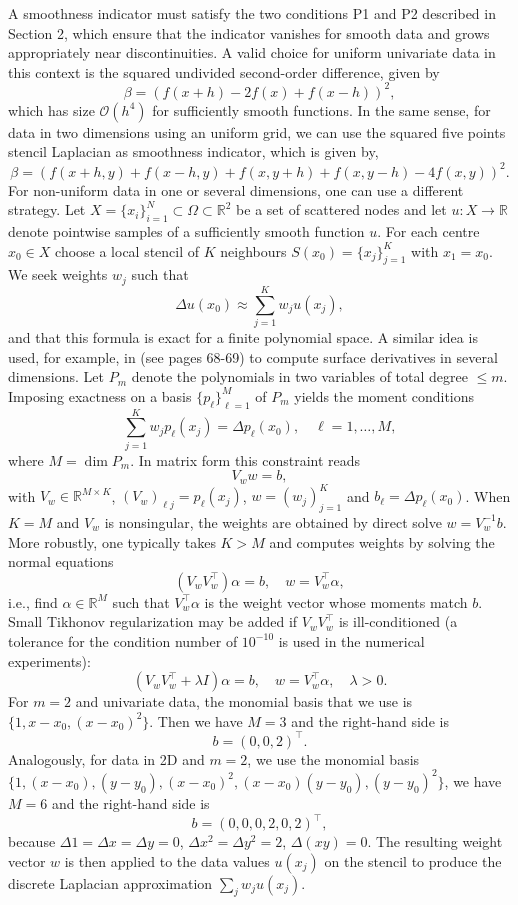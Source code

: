 \documentclass[preprint]{elsarticle}       %
\begin{document}
A smoothness indicator must satisfy the two conditions P1 and P2 described in Section 2, which ensure that the indicator vanishes for smooth data and grows appropriately near discontinuities. A valid choice for uniform univariate data in this context is the squared undivided second-order difference, given by
\begin{equation}\label{ud1}
\beta = \left( f(x+h) - 2f(x) + f(x-h) \right)^2,
\end{equation}
which has size $\mathcal{O}(h^4)$ for sufficiently smooth functions. In the same sense, for data in two dimensions using an uniform grid, we can use the squared five points stencil Laplacian as smoothness indicator, which is given by,
\begin{equation}\label{ud2}
\beta = \left( f(x+h, y) + f(x-h, y) + f(x, y+h) + f(x, y-h) - 4f(x, y) \right)^2.
\end{equation}
For non-uniform data in one or several dimensions, one can use a different strategy. 
Let $X = \{x_i\}_{i=1}^N \subset \Omega \subset \mathbb{R}^2$ be a set of scattered nodes and let $u : X \to \mathbb{R}$ denote pointwise samples of a sufficiently smooth function $u$. For each centre $x_0 \in X$ choose a local stencil of $K$ neighbours $S(x_0) = \{x_j\}_{j=1}^K$ with $x_1 = x_0$. We seek weights $w_j$ such that
\[
\Delta u(x_0) \approx \sum_{j=1}^K w_j u(x_j),
\]
and that this formula is exact for a finite polynomial space. A similar idea is used, for example, in \cite{LiIto2006} (see pages 68-69) to compute surface derivatives in several dimensions. Let $P_m$ denote the polynomials in two variables of total degree $\leq m$. Imposing exactness on a basis $\{p_\ell\}_{\ell=1}^M$ of $P_m$ yields the moment conditions
\[
\sum_{j=1}^K w_j p_\ell(x_j) = \Delta p_\ell(x_0), \quad \ell = 1, \dots, M,
\]
where $M = \dim P_m$. In matrix form this constraint reads
\[
V_w w = b,
\]
with $V_w \in \mathbb{R}^{M \times K}$, $(V_w)_{\ell j} = p_\ell(x_j)$, $w = (w_j)_{j=1}^K$ and $b_\ell = \Delta p_\ell(x_0)$. When $K = M$ and $V_w$ is nonsingular, the weights are obtained by direct solve $w = V_w^{-1} b$. More robustly, one typically takes $K > M$ and computes weights by solving the normal equations
\[
(V_w V_w^\top) \alpha = b, \quad w = V_w^\top \alpha,
\]
i.e., find $\alpha \in \mathbb{R}^M$ such that $V_w^\top \alpha$ is the weight vector whose moments match $b$. Small Tikhonov regularization may be added if $V_w V_w^\top$ is ill-conditioned (a tolerance for the condition number of $10^{-10}$ is used in the numerical experiments):
\[
(V_w V_w^\top + \lambda I) \alpha = b, \quad w = V_w^\top \alpha, \quad \lambda > 0.
\]
For $m = 2$ and univariate data, the monomial basis that we use is $\{1, x-x_0, (x-x_0)^2\}$. Then we have $M = 3$ and the right-hand side is
\[
b = ( 0, 0, 2)^\top.
\]
Analogously, for data in 2D and $m = 2$, we use the monomial basis $\{1, (x-x_0), (y-y_0), (x-x_0)^2, (x-x_0)(y-y_0), (y-y_0)^2\}$, we have $M = 6$ and the right-hand side is
\[
b = (0, 0, 0, 2, 0, 2)^\top,
\]
because $\Delta 1 = \Delta x = \Delta y = 0$, $\Delta x^2 = \Delta y^2 = 2$, $\Delta(xy) = 0$. The resulting weight vector $w$ is then applied to the data values $u(x_j)$ on the stencil to produce the discrete Laplacian approximation $\sum_j w_j u(x_j)$.
\end{document}
